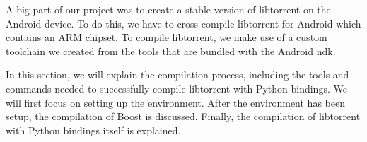 A big part of our project was to create a stable version of libtorrent on the Android device. To do this, we have to cross compile libtorrent for  Android which contains an ARM chipset. To compile libtorrent, we make use of a custom toolchain we created from the tools that are bundled with the Android ndk.
	
In this section, we will explain the compilation process, including the tools and commands needed to successfully compile libtorrent with Python bindings. We will first focus on setting up the environment. After the environment has been setup, the compilation of Boost is discussed. Finally, the compilation of libtorrent with Python bindings itself is explained.